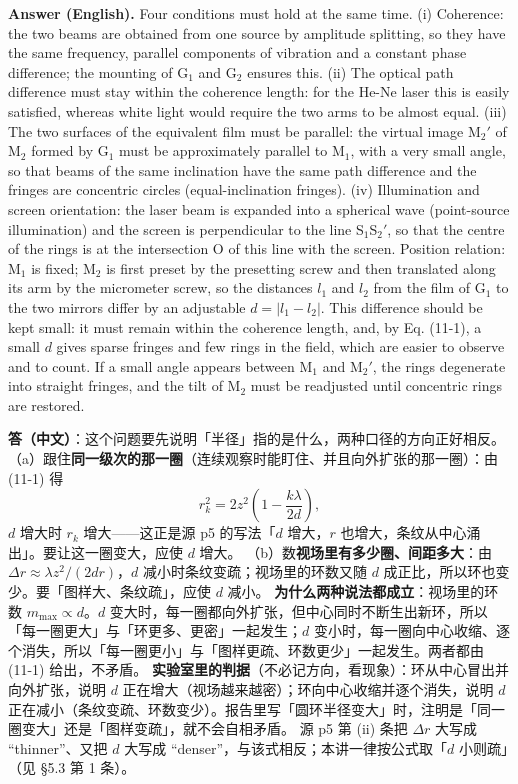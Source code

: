 \documentclass[11pt]{ctexart}
\newcommand{\Dl}{d}
\newcommand{\qaneed}[1]{\needspace{#1\textheight}}
\begin{document}
\textbf{Answer (English).} Four conditions must hold at the same time.
(i) Coherence: the two beams are obtained from one source by amplitude splitting, so they have the same frequency, parallel components of vibration and a constant phase difference; the mounting of G$_1$ and G$_2$ ensures this.
(ii) The optical path difference must stay within the coherence length: for the He-Ne laser this is easily satisfied, whereas white light would require the two arms to be almost equal.
(iii) The two surfaces of the equivalent film must be parallel: the virtual image M$_2'$ of M$_2$ formed by G$_1$ must be approximately parallel to M$_1$, with a very small angle, so that beams of the same inclination have the same path difference and the fringes are concentric circles (equal-inclination fringes).
(iv) Illumination and screen orientation: the laser beam is expanded into a spherical wave (point-source illumination) and the screen is perpendicular to the line S$_1$S$_2'$, so that the centre of the rings is at the intersection O of this line with the screen.
Position relation: M$_1$ is fixed; M$_2$ is first preset by the presetting screw and then translated along its arm by the micrometer screw, so the distances $l_1$ and $l_2$ from the film of G$_1$ to the two mirrors differ by an adjustable $\Dl=|l_1-l_2|$. This difference should be kept small: it must remain within the coherence length, and, by Eq. (11-1), a small $\Dl$ gives sparse fringes and few rings in the field, which are easier to observe and to count. If a small angle appears between M$_1$ and M$_2'$, the rings degenerate into straight fringes, and the tilt of M$_2$ must be readjusted until concentric rings are restored.

\qaneed{0.86}


\textbf{答（中文）}：这个问题要先说明「半径」指的是什么，两种口径的方向正好相反。
（a）跟住\textbf{同一级次的那一圈}（连续观察时能盯住、并且向外扩张的那一圈）：由 (11-1) 得
\[
  r_k^2=2z^2\left(1-\frac{k\lambda}{2\Dl}\right),
\]
$\Dl$ 增大时 $r_k$ 增大——这正是源 p5 的写法「$\Dl$ 增大，$r$ 也增大，条纹从中心涌出」。要让这一圈变大，应使 $\Dl$ 增大。
（b）数\textbf{视场里有多少圈、间距多大}：由 $\Delta r\approx\lambda z^2/(2\Dl r)$，$\Dl$ 减小时条纹变疏；视场里的环数又随 $\Dl$ 成正比，所以环也变少。要「图样大、条纹疏」，应使 $\Dl$ 减小。
\textbf{为什么两种说法都成立}：视场里的环数 $m_{\max}\propto\Dl$。$\Dl$ 变大时，每一圈都向外扩张，但中心同时不断生出新环，所以「每一圈更大」与「环更多、更密」一起发生；$\Dl$ 变小时，每一圈向中心收缩、逐个消失，所以「每一圈更小」与「图样更疏、环数更少」一起发生。两者都由 (11-1) 给出，不矛盾。
\textbf{实验室里的判据}（不必记方向，看现象）：环从中心冒出并向外扩张，说明 $\Dl$ 正在增大（视场越来越密）；环向中心收缩并逐个消失，说明 $\Dl$ 正在减小（条纹变疏、环数变少）。报告里写「圆环半径变大」时，注明是「同一圈变大」还是「图样变疏」，就不会自相矛盾。
源 p5 第 (ii) 条把 $\Delta r$ 大写成 ``thinner''、又把 $\Dl$ 大写成 ``denser''，与该式相反；本讲一律按公式取「$\Dl$ 小则疏」（见 §5.3 第 1 条）。
\end{document}
